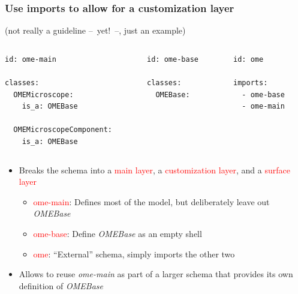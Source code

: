 \begin{frame}[fragile]
  \frametitle{Use imports to allow for a customization layer}

  (not really a guideline --~yet!~--, just an example)

  \begin{columns}[t]
    \begin{column}{.3\textwidth}
\begin{Verbatim}[frame=single,fontsize=\scriptsize]
id: ome-main

classes:
  OMEMicroscope:
    is_a: OMEBase

  OMEMicroscopeComponent:
    is_a: OMEBase
\end{Verbatim}
    \end{column}

    \begin{column}{.3\textwidth}
\begin{Verbatim}[frame=single,fontsize=\scriptsize]
id: ome-base

classes:
  OMEBase:
\end{Verbatim}
    \end{column}


    \begin{column}{.3\textwidth}
\begin{Verbatim}[frame=single,fontsize=\scriptsize]
id: ome

imports:
  - ome-base
  - ome-main
\end{Verbatim}
    \end{column}
  \end{columns}

  \begin{itemize}
    \item Breaks the schema into a \textcolor<2>{red}{main layer},
          a \textcolor<3>{red}{customization layer},
          and a \textcolor<4>{red}{surface layer}
      \begin{itemize}
        \item \textcolor<2>{red}{ome-main}: Defines most of the model,
              but  deliberately leave out \emph{OMEBase}
        \item \textcolor<3>{red}{ome-base}: Define \emph{OMEBase} as an
              empty shell
        \item \textcolor<4>{red}{ome}: ``External'' schema, simply
              imports the other two
      \end{itemize}
    \item Allows to reuse \emph{ome-main} as part of a larger schema
          that provides its own definition of \emph{OMEBase}
  \end{itemize}
\end{frame}
